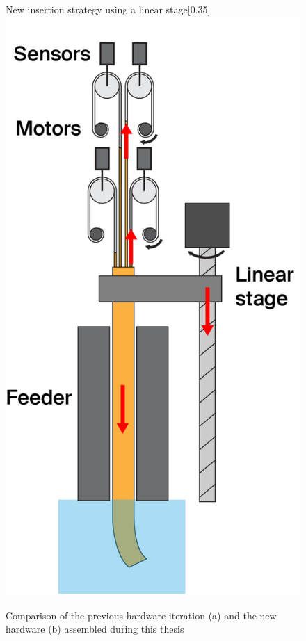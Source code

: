 \begin{figure}[H]
\begin{subcaptionbox}{New insertion strategy using a linear stage\label{fig:right}}[0.35\linewidth]
        {\includegraphics[width=\linewidth]{images/Hardware/insertion.PNG}}
    \end{subcaptionbox}
    \caption{Comparison of the previous hardware iteration (a) and the new hardware (b) assembled during this thesis}
    \label{fig:insertionStrategies}
\end{figure}



